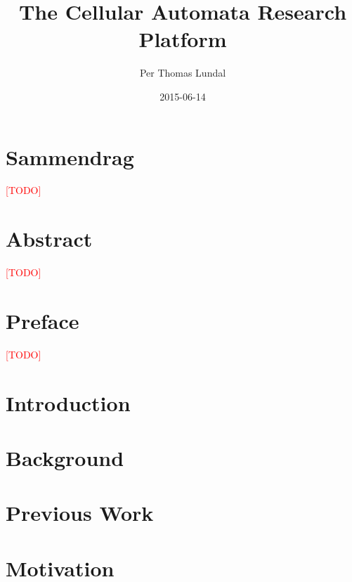 \documentclass[a4paper]{report}
\title{
    {The Cellular Automata Research Platform}\\
    \TODO
}
\author{Per Thomas Lundal}
\date{2015-06-14}
\newcommand\TODO{\textcolor{red}{[TODO]}}
\begin{document}
\maketitle

\newpage
{}

\newpage
{}
\chapter*{Sammendrag}
    \TODO

\newpage
{}
\chapter*{Abstract}
    \TODO

\newpage
{}
\chapter*{Preface}
    \TODO

\setcounter{tocdepth}{2}

\newpage
{}
\tableofcontents

\newpage
{}
\listoffigures

\newpage
{}
\listoftables

\newpage
{}

\chapter{Introduction}
    \label{ch:introduction}
    

\chapter{Background}
    \label{ch:background}
    

\chapter{Previous Work}
    \label{ch:previous-work}
    

\chapter{Motivation}
    \label{ch:motivation}
    
\end{document}
